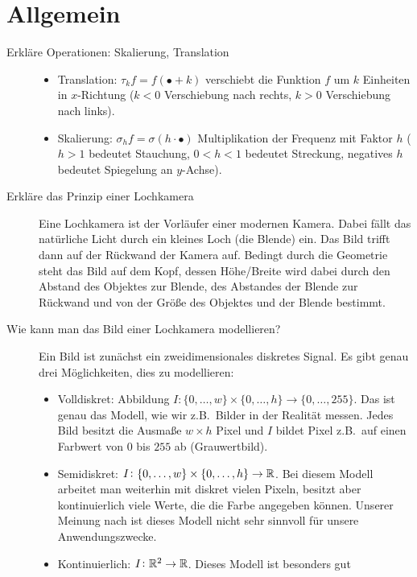 \section{Allgemein} 
\begin{description}
	\item[Erkläre Operationen: Skalierung, Translation]\leavevmode
  	\begin{itemize}
  	\item Translation: $ \tau_{k}f = f(\bullet + k) $ verschiebt die Funktion $ f $ um $ k $ 
  	Einheiten in $ x $-Richtung ($ k < 0 $ Verschiebung nach rechts, $ k > 0 $ Verschiebung nach 
  	links).
    \item Skalierung: $ \sigma_{h}f = \sigma(h \cdot \bullet) $ Multiplikation der Frequenz mit
    Faktor $ h $ ($ h > 1 $ bedeutet Stauchung, $ 0 < h < 1 $ bedeutet Streckung, negatives $ h $
    bedeutet Spiegelung an $ y $-Achse).
  	\end{itemize}
	\item[Erkläre das Prinzip einer Lochkamera]
      Eine Lochkamera ist der Vorläufer einer modernen Kamera. Dabei fällt
      das natürliche Licht durch ein kleines Loch (die Blende) ein. Das Bild
      trifft dann auf der Rückwand der Kamera auf. Bedingt durch die Geometrie
      steht das Bild auf dem Kopf, dessen Höhe/Breite wird dabei durch den
      Abstand des Objektes zur Blende, des Abstandes der Blende zur Rückwand
      und von der Größe des Objektes und der Blende bestimmt.
  \item [Wie kann man das Bild einer Lochkamera modellieren?] Ein Bild ist zunächst ein
    zweidimensionales diskretes Signal. Es gibt genau drei Möglichkeiten, dies zu modellieren:
    \begin{itemize}
    \item Volldiskret: Abbildung 
      $ I \colon \{ 0, \dots, w \} \times \{ 0, \dots, h \} \rightarrow \{ 0, \dots, 255 \} $.
      Das ist genau das Modell, wie wir z.B.\ Bilder in der Realität messen. Jedes Bild besitzt
      die Ausmaße $ w \times h $ Pixel und $ I $ bildet Pixel z.B.\ auf einen Farbwert von $ 0 $
      bis $ 255 $ ab (Grauwertbild).
    \item Semidiskret:
      $ I \colon \{ 0, \dots, w \} \times \{ 0, \dots, h \} \rightarrow \mathbb{R} $. Bei diesem Modell
      arbeitet man weiterhin mit diskret vielen Pixeln, besitzt aber kontinuierlich viele Werte,
      die die Farbe angegeben können. Unserer Meinung nach ist dieses Modell nicht sehr sinnvoll
      für unsere Anwendungszwecke.
    \item Kontinuierlich: $ I \colon \mathbb{R}^{2} \rightarrow \mathbb{R} $. Dieses Modell ist besonders gut

\end{itemize}
\end{description}

